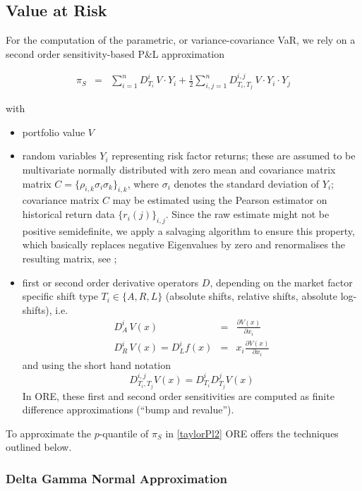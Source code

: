 \documentclass[12pt, a4paper]{article}
\begin{document}
{{\begin{appendix}
\subsection{Value at Risk}\label{sec:app_var}

For the computation of the parametric, or variance-covariance VaR, we rely on a second order sensitivity-based P\&L approximation

\begin{eqnarray}\label{taylorPl2}
  \pi_S & = & \sum_{i=1}^n D^i_{T_i}\,V\cdot Y_i 
        + \frac{1}{2} \sum_{i,j=1}^n D^{i,j}_{T_i,T_j}\,V\cdot Y_i\cdot Y_j
\end{eqnarray}

with 
\begin{itemize}
\item portfolio value $V$
\item random variables $Y_i$ representing risk factor returns; these are assumed to be multivariate normally distributed with zero mean
and covariance matrix matrix $C = \{ \rho_{i,k} \sigma_i \sigma_k \}_{i,k}$, where $\sigma_i$ denotes the standard
deviation of $Y_i$; covariance matrix $C$ may be estimated using the Pearson estimator on historical return data
$\{ r_i(j) \}_{i,j}$. Since the raw estimate might not be positive semidefinite, we apply a salvaging algorithm to
ensure this property, which basically replaces negative Eigenvalues by zero and renormalises the resulting matrix, see
\cite{corrSalv};
\item first or second order derivative operators $D$, depending
on the market factor specific shift type $T_i \in \{ A,R,L \}$ (absolute shifts, relative shifts, absolute log-shifts), i.e.
\begin{eqnarray*}\label{derivs}
  D^i_A \,V(x) &=& \frac{\partial V(x)}{\partial x_i} \\
  D^i_R \,V(x) = D^i_L f(x) &=& x_i\frac{\partial V(x)}{\partial x_i}
\end{eqnarray*}
and using the short hand notation
\begin{equation*}
  D^{i,j}_{T_i,T_j} V(x) = D^i_{T_i} D^j_{T_j} V(x)
\end{equation*}
In ORE, these first and second order sensitivities are computed as finite difference
approximations (``bump and revalue'').
\end{itemize}

To approximate the $p$-quantile of $\pi_S$ in \eqref{taylorPl2} ORE offers the techniques outlined below.

\subsubsection*{Delta Gamma Normal Approximation}
 

\end{appendix}}}
\end{document}
